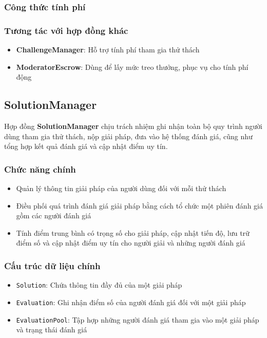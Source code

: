 \subsubsection{Công thức tính phí}

\subsubsection{Tương tác với hợp đồng khác}

\begin{itemize}
  \item \textbf{ChallengeManager}: Hỗ trợ tính phí tham gia thử thách
  \item \textbf{ModeratorEscrow}: Dùng để lấy mức treo thưởng, phục vụ cho tính phí động
\end{itemize}

\subsection{SolutionManager}

Hợp đồng \textbf{SolutionManager} chịu trách nhiệm ghi nhận toàn bộ quy trình người dùng tham gia thử thách, nộp giải pháp, đưa vào hệ thống đánh giá, cũng như tổng hợp kết quả đánh giá và cập nhật điểm uy tín.

\subsubsection{Chức năng chính}

\begin{itemize}
  \item Quản lý thông tin giải pháp của người dùng đối với mỗi thử thách
  \item Điều phối quá trình đánh giá giải pháp bằng cách tổ chức một phiên đánh giá gồm các người đánh giá
  \item Tính điểm trung bình có trọng số cho giải pháp, cập nhật tiến độ, lưu trữ điểm số và cập nhật điểm uy tín cho người giải và những người đánh giá
\end{itemize}

\subsubsection{Cấu trúc dữ liệu chính}

\begin{itemize}
  \item \texttt{Solution}: Chứa thông tin đầy đủ của một giải pháp
  \item \texttt{Evaluation}: Ghi nhận điểm số của người đánh giá đối với một giải pháp
  \item \texttt{EvaluationPool}: Tập hợp những người đánh giá tham gia vào một giải pháp và trạng thái đánh giá
\end{itemize}

